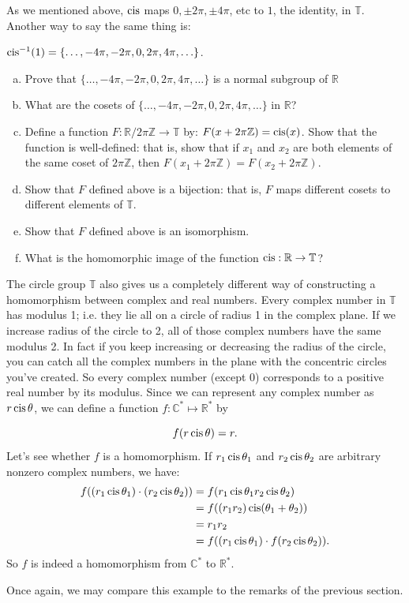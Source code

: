 \begin{exercise}\label{exercise:homomorph:circle_cosets_factorgroup}
As we mentioned above, $\operatorname{cis}$ maps $0, \pm 2\pi, \pm 4\pi$, etc to $1$, the identity, in ${ \mathbb T}$. Another way to say the same thing is:

$\operatorname{cis}^{-1}(1) = \{ \ldots , -4\pi, -2\pi, 0, 2\pi, 4\pi, \ldots \}$.

\begin{enumerate}[(a)]
\item
Prove that $\{ \ldots , -4\pi, -2\pi, 0, 2\pi, 4\pi, \ldots \}$ is a normal subgroup of ${ \mathbb R}$
\item
What are the cosets of $\{ \ldots , -4\pi, -2\pi, 0, 2\pi, 4\pi, \ldots \}$ in ${ \mathbb R}$?
\item
Define a function $F:{ \mathbb R} / 2\pi { \mathbb Z} \rightarrow { \mathbb T}$ by:  $F(x + 2\pi\mathbb{Z}) = \operatorname{cis}(x)$. Show that the function is well-defined:  that is, show that if  $x_1$ and $x_2$ are both elements of the same coset of $2\pi\mathbb{Z}$, then $F(x_1+2\pi\mathbb{Z}) = F(x_2+2\pi\mathbb{Z})$.
\item
Show that $F$ defined above is a bijection: that is, $F$ maps different cosets to different elements of $\mathbb{T}$.
\item
Show that $F$ defined above is an isomorphism.
\item
What is the homomorphic image of the function $\operatorname{cis}: \mathbb{R} \rightarrow \mathbb{T}$?
\end{enumerate}
\end{exercise} 

\begin{example}\label{example:homomorph:homo_C*}
The circle group ${ \mathbb T}$ also gives us a completely different way of constructing a homomorphism between complex and real numbers.  Every complex number in ${ \mathbb T}$ has modulus 1; i.e. they lie all on a circle of radius 1 in the complex plane.  If we increase radius of the circle to 2, all of those complex numbers have the same modulus 2.  In fact if you keep increasing or decreasing the radius of the circle, you can catch all the complex numbers in the plane with the concentric circles you've created.  So every complex number (except 0) corresponds to a positive real number by its modulus. Since we can represent any complex number as $r \operatorname{cis} \theta$, we can define a function
$f:  {\mathbb C}^\ast \mapsto  {\mathbb R}^\ast$ by

\[
f(r \operatorname{cis} \theta) = r.
\]
Let's see whether $f$ is a homomorphism. If $r_1 \operatorname{cis} \theta_1$ and $r_2 \operatorname{cis} \theta_2$ are arbitrary nonzero complex numbers, we have:
\begin{align*}
f((r_1\operatorname{cis} \theta_1)\cdot (r_2\operatorname{cis} \theta_2)) &= f(r_1 \operatorname{cis} \theta_1 r_2 \operatorname{cis} \theta_2)\\
&= f((r_1 r_2)\operatorname{cis} (\theta_1+ \theta_2))\\
&= r_1 r_2 \\
&= f((r_1\operatorname{cis} \theta_1)\cdot f(r_2\operatorname{cis} \theta_2)).
\end{align*}
So $f$ is indeed a homomorphism from ${\mathbb C}^\ast$ to ${\mathbb R}^\ast$.
\end{example}
Once again, we may compare this example to the remarks of the previous section.

